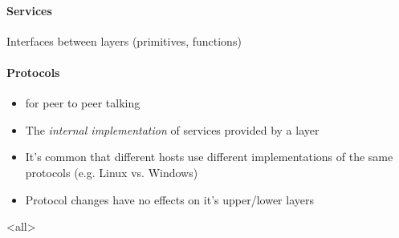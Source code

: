 \paragraph{Services}

Interfaces between layers (primitives, functions)

\paragraph{Protocols}

\begin{itemize}
\item for peer to peer talking
\item The \emph{internal implementation} of services provided by a layer
\item It's common that different hosts use different implementations of the same protocols
  (e.g. Linux vs. Windows)
\item Protocol changes have no effects on it's upper/lower layers
\end{itemize}

\mode<all>
